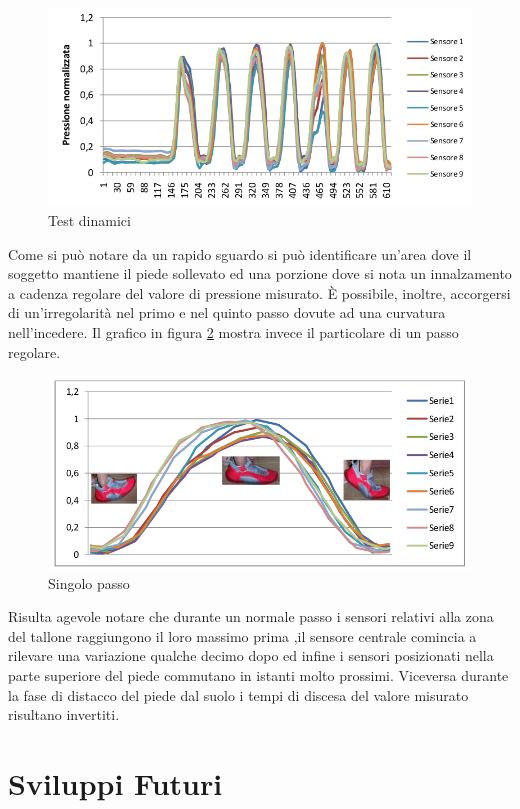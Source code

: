 \documentclass[12pt,a4paper,oneside,openright,italian]{article}
\begin{document}
\begin{figure}[!hbp]
  \centering
  \includegraphics[width=330pt]{immagini/risposta.png}
  \caption{Test dinamici}
  \label{dynamic}
\end{figure}

Come si pu\`o notare da un rapido sguardo si pu\`o identificare un'area dove il soggetto mantiene il piede sollevato ed una porzione dove si nota un innalzamento a cadenza regolare del valore di pressione misurato. \`E possibile, inoltre, accorgersi di un'irregolarit\`a nel primo e nel quinto passo dovute ad una curvatura nell'incedere. Il grafico in figura \ref{singlestep} mostra invece il particolare di un passo regolare.

\begin{figure}[!hbp]
  \centering
  \includegraphics[width=330pt]{immagini/singlestep.png}
  \caption{Singolo passo}
  \label{singlestep}
\end{figure}

Risulta agevole notare che durante un normale passo i sensori relativi alla zona del tallone raggiungono il loro massimo prima ,il sensore centrale comincia a rilevare una variazione qualche decimo dopo ed infine i sensori posizionati nella parte superiore del piede commutano in istanti molto prossimi. Viceversa durante la fase di distacco del piede dal suolo i tempi di discesa del valore misurato risultano invertiti.

\newpage
\section{Sviluppi Futuri}
\end{document}
